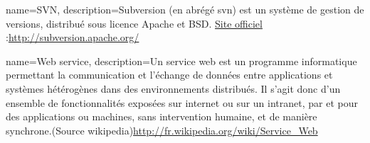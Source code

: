 {name={SVN},
description={Subversion (en abrégé svn) est un système de gestion de versions, distribué sous licence Apache et BSD. \href{http://subversion.apache.org/}{Site officiel} :\url{http://subversion.apache.org/}
}
}



{name={Web service},
description={Un service web est un programme informatique permettant la communication et l'échange de données entre applications et systèmes hétérogènes dans des environnements distribués. Il s'agit donc d'un ensemble de fonctionnalités exposées sur internet ou sur un intranet, par et pour des applications ou machines, sans intervention humaine, et de manière synchrone.(Source wikipedia)\url{http://fr.wikipedia.org/wiki/Service_Web}
}
}
